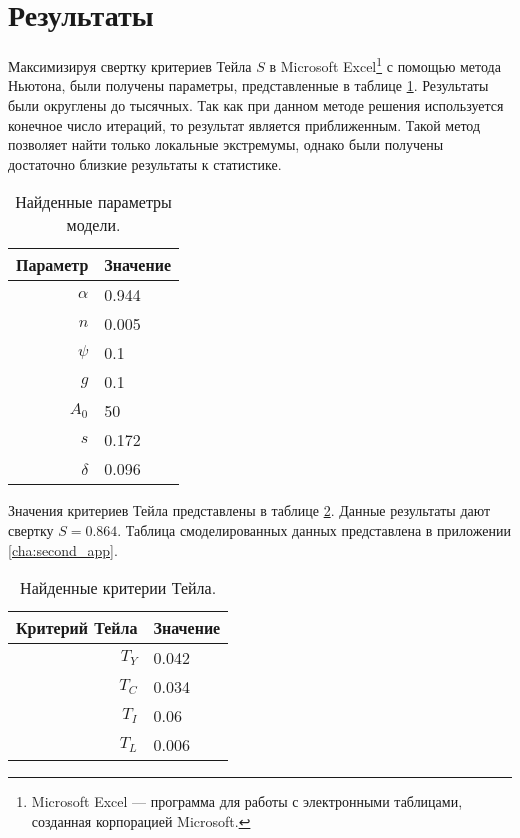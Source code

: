 \section{Результаты}

Максимизируя свертку критериев Тейла $S$ в Microsoft Excel\footnote{Microsoft Excel --- программа для работы с электронными таблицами, созданная корпорацией Microsoft.} с помощью метода Ньютона, были получены параметры, представленные в таблице \ref{tab::res_params}.
Результаты были округлены до тысячных.
Так как при данном методе решения используется конечное число итераций, то результат является приближенным.
Такой метод позволяет найти только локальные экстремумы, однако были получены достаточно близкие результаты к статистике.

\begin{table}[ht]
	\centering
	\caption{Найденные параметры модели.}
	\label{tab::res_params}
	\begin{tabular}{|r|l|}
	\hline
	Параметр & Значение         \\ \hline
	$\alpha$ &      0.944       \\
	$n$      &      0.005       \\
	$\psi$   &      0.1         \\
	$g$      &      0.1         \\
	$A_0$    &      50          \\
	$s$      &      0.172       \\
	$\delta$ &      0.096       \\ \hline
	\end{tabular}%
\end{table}

Значения критериев Тейла представлены в таблице \ref{tab::res_crit_teil}.
Данные результаты дают свертку $S=0.864$.
Таблица смоделированных данных представлена в приложении \ref{cha:second_app}.

\begin{table}[ht]
	\centering
	\caption{Найденные критерии Тейла.}
	\label{tab::res_crit_teil}
	\begin{tabular}{|r|l|}
	\hline
	Критерий Тейла & Значение         \\ \hline
	$T_{Y}$        &      0.042       \\
	$T_{C}$        &      0.034       \\
	$T_{I}$        &      0.06        \\
	$T_{L}$        &      0.006       \\ \hline
	\end{tabular}%
\end{table}

